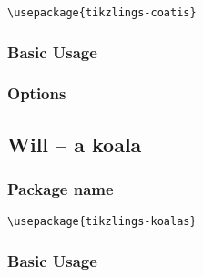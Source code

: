 \documentclass[parskip=half]{scrartcl}
\begin{document}
\begin{tcolorbox}
\vspace*{0.5cm}
\lstinline|\usepackage{tikzlings-coatis}|
\vspace*{0.5cm}
\end{tcolorbox}

\subsubsection{Basic Usage}

\begin{tcblisting}{}
\coati
\end{tcblisting}

\subsubsection{Options}

\begin{tcblisting}{}
\coati[body=SteelBlue]
\end{tcblisting}

\begin{tcblisting}{}
\coati[rotatehead=-15]
\end{tcblisting}

\begin{tcblisting}{}
\coati[sideward]
\end{tcblisting}

\begin{tcblisting}{}
\coati[3D]
\end{tcblisting}


\clearpage
\subsection{Will -- a koala}

\subsubsection{Package name}

\begin{tcolorbox}
\vspace*{0.5cm}
\lstinline|\usepackage{tikzlings-koalas}|
\vspace*{0.5cm}
\end{tcolorbox}

\subsubsection{Basic Usage}
\end{document}
